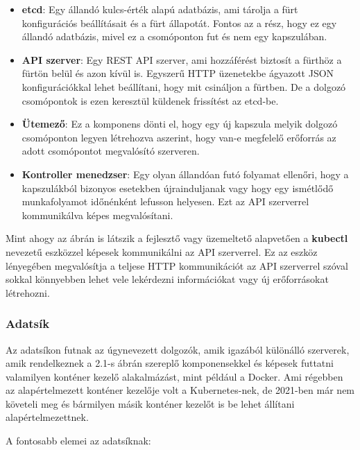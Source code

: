 \begin{itemize}
	\item \textbf{etcd}: Egy állandó kulcs-érték alapú adatbázis, ami tárolja 
	a fürt konfigurációs beállításait és a fürt állapotát. Fontos az a rész, 
	hogy ez egy állandó adatbázis, mivel ez a csomóponton fut és nem egy 
	kapszulában.   
	\item \textbf{API szerver}: Egy REST API szerver, ami hozzáférést biztosít
	a fürthöz a fürtön belül és azon kívül is. Egyszerű HTTP üzenetekbe ágyazott
	JSON konfigurációkkal lehet beállítani, hogy mit csináljon a fürtben. De 
	a dolgozó csomópontok is ezen keresztül küldenek frissítést az etcd-be. 
	\item \textbf{Ütemező}: Ez a komponens dönti el, hogy egy új kapszula melyik
	dolgozó csomóponton legyen létrehozva aszerint, hogy van-e megfelelő erőforrás
	az adott csomópontot megvalósító szerveren.
	\item \textbf{Kontroller menedzser}: Egy olyan állandóan futó folyamat ellenőri,
	hogy a kapszulákból bizonyos esetekben újrainduljanak vagy hogy egy ismétlődő 
	munkafolyamot időnénként lefusson helyesen. Ezt az API szerverrel kommunikálva
	képes megvalósítani. 
\end{itemize}

Mint ahogy az ábrán is látszik a fejlesztő vagy üzemeltető alapvetően a \textbf{kubectl}
nevezetű eszközzel képesek kommunikálni az API szerverrel. Ez az eszköz lényegében
megvalósítja a teljese HTTP kommunikációt az API szerverrel szóval sokkal könnyebben 
lehet vele lekérdezni információkat vagy új erőforrásokat létrehozni. 

\subsubsection{Adatsík}

Az adatsíkon futnak az úgynevezett dolgozók, amik igazából különálló szerverek,
amik rendelkeznek a 2.1-s ábrán szereplő komponensekkel és képesek futtatni 
valamilyen konténer kezelő alakalmázást, mint például a Docker. Ami régebben az 
alapértelmezett konténer kezelője volt a Kubernetes-nek, de 2021-ben már nem 
követeli meg és bármilyen másik konténer kezelőt is be lehet állítani alapértelmezettnek.

A fontosabb elemei az adatsíknak:

